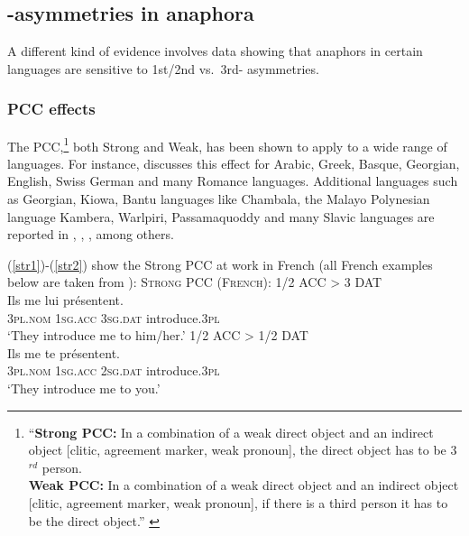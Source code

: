 \documentclass[output=paper, modfonts, nonflat]{langsci/langscibook}
\begin{document}
 \subsection{\person-asymmetries in anaphora}

 A different kind of evidence involves data showing that anaphors in
 certain languages are sensitive to 1st/2nd vs.\ 3rd-\person{}
 asymmetries. 

\subsubsection{PCC effects}

The PCC,\footnote{``\textbf{Strong PCC:} In a combination of a weak
  direct object and an indirect object [clitic, agreement marker, weak
  pronoun], the direct object has to be 3$^{rd}$ person.\\\textbf{Weak
    PCC:} In a combination of a weak direct object and an indirect
  object [clitic, agreement marker, weak pronoun], if there is a third
  person it has to be the direct object.''  \citep[][182]{bonet:1991}}
both Strong and Weak, has been shown to apply to a wide
range of languages. For instance, \citet{bonet:1991} discusses this
effect for Arabic, Greek, Basque, Georgian, English, Swiss German and
many Romance languages. Additional languages such as Georgian, Kiowa,
Bantu languages like Chambala, the Malayo Polynesian language Kambera,
Warlpiri, Passamaquoddy and many Slavic languages are reported in
\citet{haspelmath:2004}, \citet{bejarrezac:2003}, \citet{doliana:2013}, among others.

(\ref{str1})-(\ref{str2}) show the Strong PCC at work in
French %
(all French examples below are taken from
\citealt{raynaud:2017}):
\ea\label{fr} \textsc{Strong PCC (French):}
\ea\label{str1}  1/2 ACC > 3 DAT\\
\gll *Ils me lui pr\'esentent.\\
\textsc{3pl.nom} \textsc{1sg.acc} \textsc{3sg.dat} introduce.\textsc{3pl}\\
\glt `They introduce me to him/her.'
\ex\label{str2}  1/2 ACC > 1/2 DAT\\
\gll *Ils me te pr\'esentent.\\
\textsc{3pl.nom} \textsc{1sg.acc} \textsc{2sg.dat} introduce.\textsc{3pl}\\
\glt `They introduce me to you.'  \z \z
\end{document}
